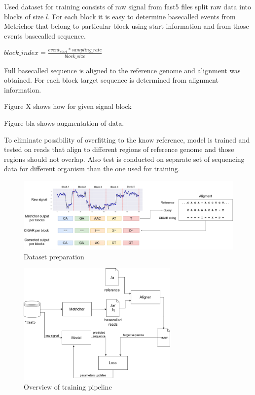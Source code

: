 \documentclass[times, utf8, diplomski, english]{fer}
\begin{document}
Used dataset for training consists of raw signal from fast5 files split raw data into blocks of size $l$.
For each block it is easy to determine basecalled events from Metrichor that belong to particular block using start information and from those events basecalled sequence. 


$block\_index =  \frac{event_{start} * sampling\_rate}{block\_size}$

Full basecalled sequence is aligned to the reference genome and alignment was obtained. For each block target sequence is determined from alignment information.

Figure X shows how for given signal block


Figure bla shows augmentation of data.

To eliminate possibility of overfitting to the know reference, model is trained and tested on reads that align to different regions of reference genome and those regions should not overlap. Also test is conducted on separate set of sequencing data for different organism than the one used for training. 

\begin{figure}[!ht]
	\begin{center}
		\includegraphics[width=1\textwidth]{./imgs/train_data_correction.png}
		\caption{Dataset preparation}
		\label{fg:data_correction}
	\end{center}
\end{figure}
\begin{figure}[!ht]
	\begin{center}
		\includegraphics[width=0.7\textwidth]{./imgs/train_pipeline.png}
		\caption{Overview of training pipeline}
		\label{fg:train_pipe}
	\end{center}
\end{figure}
\end{document}
